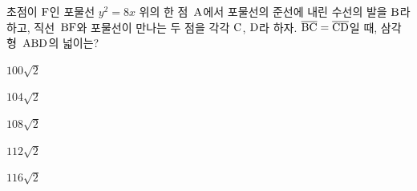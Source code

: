 초점이 $\mathrm{F}$인 포물선 $y^2=8x$ 위의 한 점~$\mathrm{A}$에서 포물선의 준선에 내린 수선의 발을 $\mathrm{B}$라 하고, 직선~$\mathrm{BF}$와 포물선이 만나는 두 점을 각각 $\mathrm{C}$, $\mathrm{D}$라 하자. $\overline{\mathrm{BC}}=\overline{\mathrm{CD}}$일 때, 삼각형~$\mathrm{ABD}$의 넓이는? 
\begin{choices32}{\rule[-3ex]{0pt}{8ex}$100\sqrt{2}$}{\rule[-3ex]{0pt}{8ex}$104\sqrt{2}$}{\rule[-3ex]{0pt}{8ex}$108\sqrt{2}$}{\rule[-3ex]{0pt}{8ex}$112\sqrt{2}$}{\rule[-3ex]{0pt}{8ex}$116\sqrt{2}$}\end{choices32}
